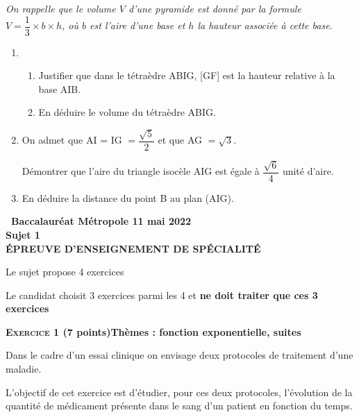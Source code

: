 \documentclass[10pt,a4paper]{article}
\begin{document}
\medskip

\emph{On rappelle que le volume $V$ d'une pyramide est donné par la formule $V = \dfrac{1}{3} \times  b \times h$, où $b$ est l'aire d'une base et $h$ la hauteur associée à cette base.}

\medskip

\begin{enumerate}
\item 
	\begin{enumerate}
		\item Justifier que dans le tétraèdre ABIG, [GF] est la hauteur relative à la base AIB. 
		\item En déduire le volume du tétraèdre ABIG.
	\end{enumerate}
\item On admet que AI = IG $= \dfrac{\sqrt{5}}{2}$ et que AG $= \sqrt 3$.

Démontrer que l'aire du triangle isocèle AIG est égale à $\dfrac{\sqrt{6}}{4}$ unité d'aire.
\item En déduire la distance du point B au plan (AIG).
\end{enumerate}
\newpage
\hypertarget{Metropole1}{}

\label{Metropole1}

\pagestyle{fancy}
\thispagestyle{empty}

\begin{center}{\Large\textbf{\decofourleft~Baccalauréat Métropole 11 mai 2022~\decofourright\\[6pt]  Sujet 1\\[7pt] ÉPREUVE D'ENSEIGNEMENT DE SPÉCIALITÉ}}
\end{center}

\vspace{0,25cm}

Le sujet propose 4 exercices

Le candidat choisit 3 exercices parmi les 4 et \textbf{ne doit traiter que ces 3 exercices}

\bigskip

\textbf{\textsc{Exercice 1} \quad (7 points)\hfill Thèmes : fonction exponentielle, suites}

\medskip

Dans le cadre d'un essai clinique on envisage deux protocoles de traitement 
d'une maladie.

L'objectif de cet exercice est d'étudier, pour ces deux protocoles, l'évolution de la quantité de médicament présente dans le sang d'un patient en fonction du temps.
\end{document}
